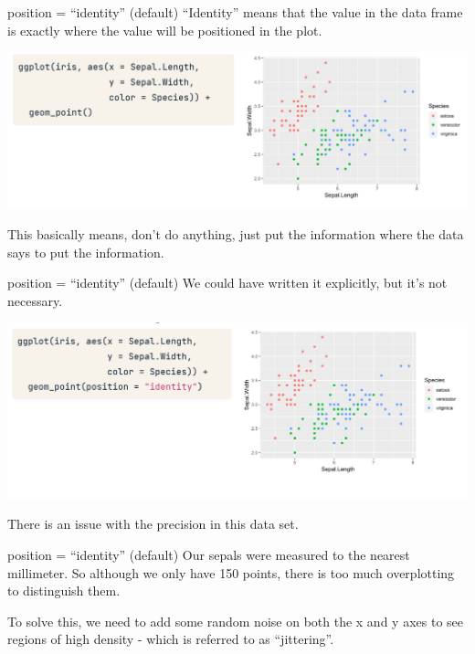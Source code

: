 \documentclass[
  ignorenonframetext,
]{beamer}
\begin{document}
\begin{frame}{position = ``identity'' (default)}
\label{position-identity-default-1}
``Identity'' means that the value in the data frame is exactly where the
value will be positioned in the plot.

\includegraphics{../images/im153.png}

This basically means, don't do anything, just put the information where
the data says to put the information.
\end{frame}

\begin{frame}{position = ``identity'' (default)}
\label{position-identity-default-2}
We could have written it explicitly, but it's not necessary.

\includegraphics{../images/im154.png}

There is an issue with the precision in this data set.
\end{frame}

\begin{frame}{position = ``identity'' (default)}
\label{position-identity-default-3}
Our sepals were measured to the nearest millimeter. So although we only
have 150 points, there is too much overplotting to distinguish them.

To solve this, we need to add some random noise on both the x and y axes
to see regions of high density - which is referred to as ``jittering''.
\end{frame}
\end{document}
